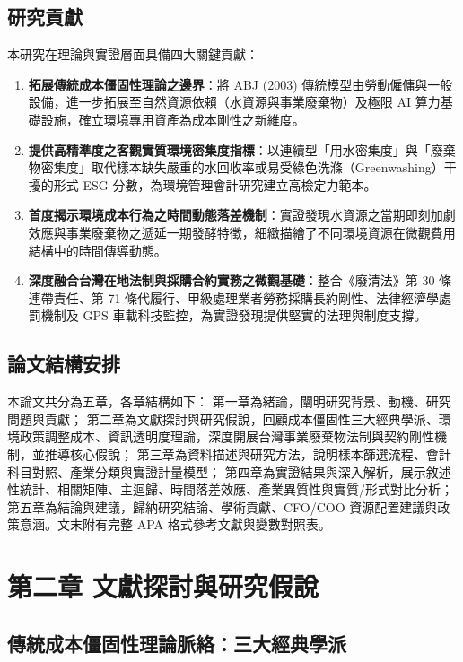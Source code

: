 \documentclass[12pt,a4paper]{article}
\begin{document}
\subsection{研究貢獻}

本研究在理論與實證層面具備四大關鍵貢獻：
\begin{enumerate}[leftmargin=*]
    \item \textbf{拓展傳統成本僵固性理論之邊界}：將 ABJ (2003) 傳統模型由勞動僱傭與一般設備，進一步拓展至自然資源依賴（水資源與事業廢棄物）及極限 AI 算力基礎設施，確立環境專用資產為成本剛性之新維度。
    \item \textbf{提供高精準度之客觀實質環境密集度指標}：以連續型「用水密集度」與「廢棄物密集度」取代樣本缺失嚴重的水回收率或易受綠色洗滌（Greenwashing）干擾的形式 ESG 分數，為環境管理會計研究建立高檢定力範本。
    \item \textbf{首度揭示環境成本行為之時間動態落差機制}：實證發現水資源之當期即刻加劇效應與事業廢棄物之遞延一期發酵特徵，細緻描繪了不同環境資源在微觀費用結構中的時間傳導動態。
    \item \textbf{深度融合台灣在地法制與採購合約實務之微觀基礎}：整合《廢清法》第 30 條連帶責任、第 71 條代履行、甲級處理業者勞務採購長約剛性、法律經濟學處罰機制及 GPS 車載科技監控，為實證發現提供堅實的法理與制度支撐。
\end{enumerate}

\subsection{論文結構安排}

本論文共分為五章，各章結構如下：
第一章為緒論，闡明研究背景、動機、研究問題與貢獻；
第二章為文獻探討與研究假說，回顧成本僵固性三大經典學派、環境政策調整成本、資訊透明度理論，深度開展台灣事業廢棄物法制與契約剛性機制，並推導核心假說；
第三章為資料描述與研究方法，說明樣本篩選流程、會計科目對照、產業分類與實證計量模型；
第四章為實證結果與深入解析，展示敘述性統計、相關矩陣、主迴歸、時間落差效應、產業異質性與實質/形式對比分析；
第五章為結論與建議，歸納研究結論、學術貢獻、CFO/COO 資源配置建議與政策意涵。文末附有完整 APA 格式參考文獻與變數對照表。

\newpage

\section{第二章 文獻探討與研究假說}

\subsection{傳統成本僵固性理論脈絡：三大經典學派}
\end{document}
